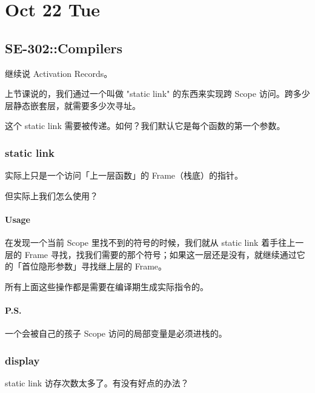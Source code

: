 \documentclass[
]{article}
\date{}
\begin{document}
\hypertarget{header-n0}{%
\section{Oct 22 Tue}\label{header-n0}}

\hypertarget{header-n2}{%
\subsection{SE-302::Compilers}\label{header-n2}}

继续说 Activation Records。

上节课说的，我们通过一个叫做 "static link" 的东西来实现跨 Scope
访问。跨多少层静态嵌套层，就需要多少次寻址。

这个 static link 需要被传递。如何？我们默认它是每个函数的第一个参数。

\hypertarget{header-n6}{%
\subsubsection{static link}\label{header-n6}}

实际上只是一个访问「上一层函数」的 Frame（栈底）的指针。

但实际上我们怎么使用？

\hypertarget{header-n9}{%
\paragraph{Usage}\label{header-n9}}

在发现一个当前 Scope 里找不到的符号的时候，我们就从 static link
着手往上一层的 Frame
寻找，找我们需要的那个符号；如果这一层还是没有，就继续通过它的「首位隐形参数」寻找继上层的
Frame。

所有上面这些操作都是需要在编译期生成实际指令的。

\hypertarget{header-n12}{%
\paragraph{P.S.}\label{header-n12}}

一个会被自己的孩子 Scope 访问的局部变量是必须进栈的。

\hypertarget{header-n14}{%
\subsubsection{display}\label{header-n14}}

static link 访存次数太多了。有没有好点的办法？
\end{document}

